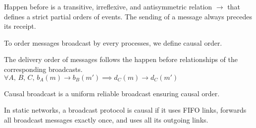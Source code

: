 \begin{definition}
  Happen before is a transitive, irreflexive, and antisymmetric relation $\rightarrow$ that
  defines a strict partial orders of events.  The sending of a message always
  precedes its receipt.
\end{definition}





To order messages broadcast by every processes, we define causal order.

\begin{definition}
  The delivery order of messages follows the happen before relationships of the
  corresponding broadcasts. $\forall A,\,B,\,C,\,
  b_A(m) \rightarrow b_B(m') \implies d_C(m) \rightarrow d_C(m')$
\end{definition}


\begin{definition}
  Causal broadcast is a uniform reliable broadcast ensuring causal order.
\end{definition}

\begin{theorem}
  In static networks, a broadcast protocol is causal if it uses FIFO links,
  forwards all broadcast messages exactly once, and uses all its outgoing links.
\end{theorem}

